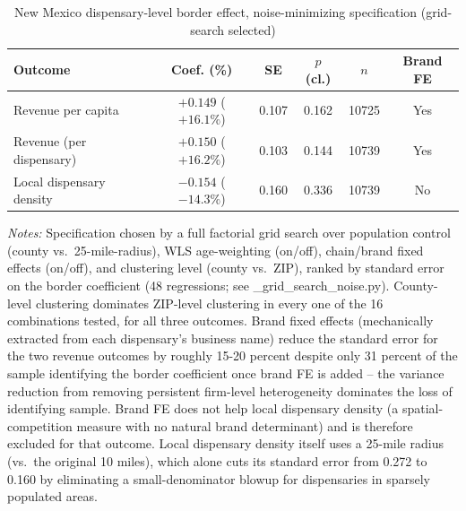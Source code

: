 \begin{table}[htbp]
\centering
\caption{New Mexico dispensary-level border effect, noise-minimizing specification (grid-search selected)}
\label{tab:nm_dispensary_border_best}
\footnotesize
\begin{tabular}{lccccc}
\toprule
Outcome & Coef. (\%) & SE & $p$ (cl.) & $n$ & Brand FE \\
\midrule
Revenue per capita & $+0.149$ ($+16.1\%$) & 0.107 & 0.162 & 10725 & Yes \\
Revenue (per dispensary) & $+0.150$ ($+16.2\%$) & 0.103 & 0.144 & 10739 & Yes \\
Local dispensary density & $-0.154$ ($-14.3\%$) & 0.160 & 0.336 & 10739 & No \\
\bottomrule
\end{tabular}
\begin{minipage}{0.98\textwidth}
\vspace{0.3em}
\footnotesize
\textit{Notes:} Specification chosen by a full factorial grid search over population control (county vs.\
25-mile-radius), WLS age-weighting (on/off), chain/brand fixed effects (on/off), and clustering level
(county vs.\ ZIP), ranked by standard error on the border coefficient (48 regressions; see
\_grid\_search\_noise.py). County-level clustering dominates ZIP-level clustering in every one of the 16
combinations tested, for all three outcomes. Brand fixed effects (mechanically extracted from each
dispensary's business name) reduce the standard error for the two revenue outcomes by roughly 15-20 percent
despite only 31 percent of the sample identifying the border coefficient once brand FE is added -- the
variance reduction from removing persistent firm-level heterogeneity dominates the loss of identifying
sample. Brand FE does not help local dispensary density (a spatial-competition measure with no natural
brand determinant) and is therefore excluded for that outcome. Local dispensary density itself uses a
25-mile radius (vs.\ the original 10 miles), which alone cuts its standard error from 0.272 to 0.160 by
eliminating a small-denominator blowup for dispensaries in sparsely populated areas.
\end{minipage}
\end{table}
